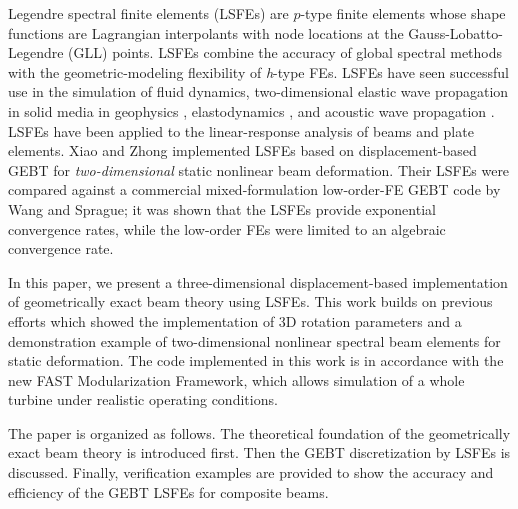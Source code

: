 Legendre spectral finite elements\cite{Patera:1984,Ronquist:1987} (LSFEs)
are $p$-type finite elements whose shape functions are Lagrangian
interpolants with node locations at the Gauss-Lobatto-Legendre (GLL) points.
LSFEs combine the accuracy of global spectral methods with the
geometric-modeling
flexibility of {\it h}-type FEs. LSFEs have seen successful use
in the simulation of fluid dynamics\cite{Ronquist:1987, Patera:1984,
Deville:2002}, two-dimensional elastic wave propagation in solid media in
geophysics \cite{Komatitsch:1998}, elastodynamics \cite{Sridhar:2006}, and
acoustic wave propagation \cite{Sprague:2004}. LSFEs have been applied to
the linear-response analysis of
beams\cite{Ben-Tal-etal:1995,Ben-Tal-etal:1996,Kudela-etal:2007a,Sprague-Geers:2008,Wang:SFE2013}
and plate elements\cite{Zrahia-Bar-Yoseph:1995,
Kudela-etal:2007b,Sprague-Brito:2012}.   Xiao and
Zhong\cite{Xiao-Zhong:2012} implemented LSFEs based on displacement-based
GEBT for \textit{two-dimensional} static nonlinear beam deformation. Their
LSFEs were compared against a commercial mixed-formulation
low-order-FE GEBT code by Wang and
Sprague\cite{Wang:SFE2013};  it was shown that the LSFEs provide
exponential convergence rates, while the low-order FEs were limited to
an algebraic convergence rate.

In this paper, we present a three-dimensional displacement-based
implementation of geometrically exact beam theory using LSFEs.  This work
builds on previous efforts which showed the implementation of 3D rotation
parameters\cite{Wang:GEBT2013} and a demonstration example of
two-dimensional nonlinear spectral beam elements\cite{Wang:SFE2013} for
static deformation.  The code implemented in this work is in accordance with
the new FAST Modularization Framework\cite{Jonkman:2013},  which allows
simulation of a whole turbine under realistic operating conditions.

The paper is organized as follows.  The theoretical foundation of the
geometrically exact beam theory is introduced first. Then the GEBT
discretization by LSFEs is discussed. Finally, verification examples are
provided to show the accuracy and efficiency of the GEBT LSFEs  for
composite beams.  



